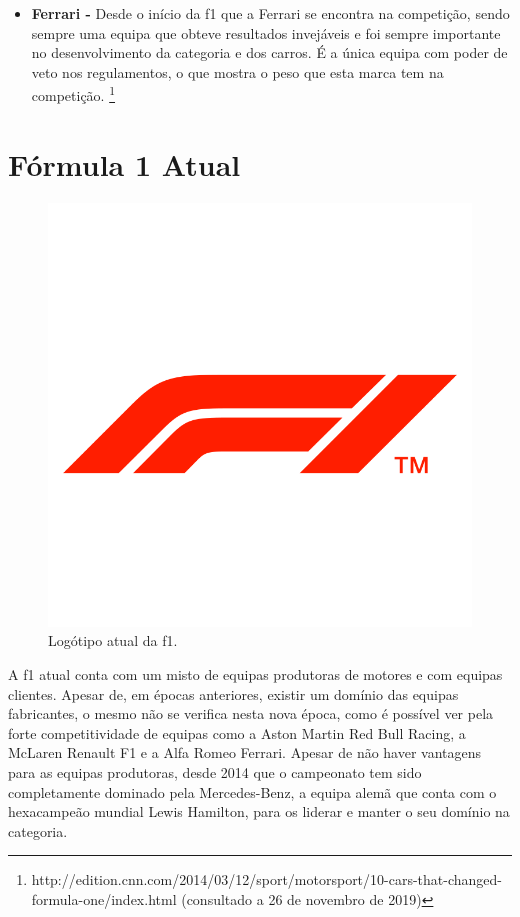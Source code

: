 \documentclass{report}
\begin{document}
\begin{itemize}
    \item \textbf{Ferrari - } Desde o início da \ac{f1} que a Ferrari se encontra na competição, sendo sempre uma equipa que obteve resultados invejáveis e foi sempre importante no desenvolvimento da categoria e dos carros. É a única equipa com poder de veto nos regulamentos, o que mostra o peso que esta marca tem na competição. \footnote[2]{http://edition.cnn.com/2014/03/12/sport/motorsport/10-cars-that-changed-formula-one/index.html (consultado a 26 de novembro de 2019)}
\end{itemize}
\chapter{Fórmula 1 Atual}
\label{chap.f1atual}
\begin{figure}[h]
\centering
\includegraphics[scale=0.1]{Fotos/logo_f1.png}
\caption{Logótipo atual da \ac{f1}.}
\label{logof1}
\end{figure}
\hspace{\parindent}A \ac{f1} atual conta com um misto de equipas produtoras de motores e com equipas clientes. Apesar de, em épocas anteriores, existir um domínio das equipas fabricantes, o mesmo não se verifica nesta nova época, como é possível ver pela forte competitividade de equipas como a Aston Martin Red Bull Racing, a McLaren Renault F1 e a Alfa Romeo Ferrari. Apesar de não haver vantagens para as equipas produtoras, desde 2014 que o campeonato tem sido completamente dominado pela Mercedes-Benz, a equipa alemã que conta com o hexacampeão mundial Lewis Hamilton, para os liderar e manter o seu domínio na categoria.
\end{document}
